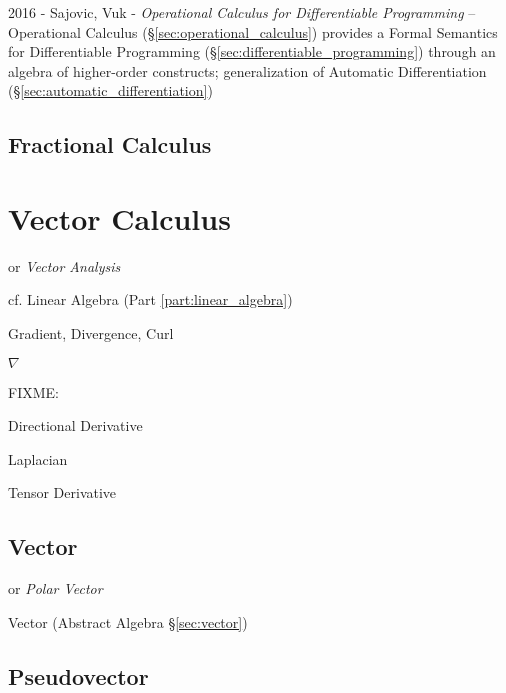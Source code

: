 2016 - Sajovic, Vuk - \emph{Operational Calculus for Differentiable Programming}
-- Operational Calculus (\S\ref{sec:operational_calculus}) provides a Formal
Semantics for Differentiable Programming
(\S\ref{sec:differentiable_programming}) through an algebra of higher-order
constructs; generalization of Automatic Differentiation
(\S\ref{sec:automatic_differentiation})



\subsection{Fractional Calculus}\label{sec:fractional_calculus}



\section{Vector Calculus}\label{sec:vector_calculus}

or \emph{Vector Analysis}

\fist cf. Linear Algebra (Part \ref{part:linear_algebra})

Gradient, Divergence, Curl

$\nabla$

FIXME:

Directional Derivative

Laplacian

Tensor Derivative



\subsection{Vector}\label{sec:linear_vector}

or \emph{Polar Vector}

\fist Vector (Abstract Algebra \S\ref{sec:vector})



\subsection{Pseudovector}\label{sec:pseudovector}

